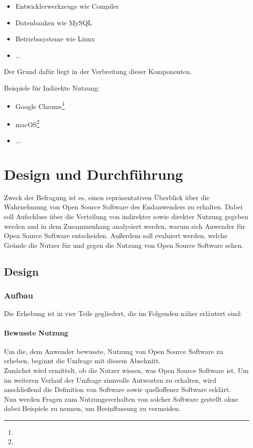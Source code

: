 \documentclass[a4paper]{article}
\begin{document}
                    \begin{itemize}
                        \item Entwicklerwerkzeuge wie Compiler
                        \item Datenbanken wie MySQL
                        \item Betriebssysteme wie Linux 
                        \item ... %
                    \end{itemize}
                    Der Grund dafür liegt in der Verbreitung dieser Komponenten. %
                    
                    Beispiele für Indirekte Nutzung:
                    \begin{itemize}
                        \item Google Chrome\footnote{}
                        \item macOS\footnote{}
                        \item ... %
                    \end{itemize}

            
        
    \section{Design und Durchführung}
		Zweck der Befragung ist es, einen repräsentativen Überblick über die Wahrnehmung von Open Source Software des Endanwenders zu erhalten. Dabei soll Aufschluss über die Verteilung von indirekter sowie direkter Nutzung gegeben werden und in dem Zusammenhang analysiert werden, warum sich Anwender für Open Source Software entscheiden. Außerdem soll evaluiert werden, welche Gründe die Nutzer für und gegen die Nutzung von Open Source Software sehen.
	
		\subsection{Design}
		  \subsubsection{Aufbau}
    			Die Erhebung ist in vier Teile gegliedert, die im Folgenden näher erläutert sind: 
    		   
    			\paragraph{Bewusste Nutzung}
    				Um die, dem Anwender bewusste, Nutzung von Open Source Software zu erheben, beginnt die Umfrage mit diesem Abschnitt.\\
    				Zunächst wird ermittelt, ob die Nutzer wissen, was Open Source Software ist. Um im weiteren Verlauf der Umfrage sinnvolle Antworten zu erhalten, wird anschließend die Definition von Software sowie quelloffener Software erklärt.\\
    				Nun werden Fragen zum Nutzungsverhalten von solcher Software gestellt ohne dabei Beispiele zu nennen, um Beeinflussung zu vermeiden.
    			
\end{document}
